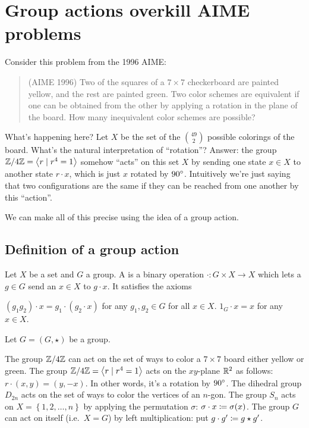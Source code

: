 \chapter{Group actions overkill AIME problems}
Consider this problem from the 1996 AIME:
\begin{quote}
	(AIME 1996) Two of the squares of a $7 \times 7$ checkerboard are painted yellow, and the rest are painted green. Two color schemes are equivalent if one can be obtained from the other by applying a rotation in the plane of the board. How many inequivalent color schemes are possible?
\end{quote}

What's happening here? Let $X$ be the set of the $\binom{49}{2}$ possible colorings of the board.
What's the natural interpretation of ``rotation''?
Answer: the group $\mathbb Z/4\mathbb Z = \left<r \mid r^4=1\right>$ somehow ``acts'' on this set $X$ by sending one state $x \in X$ to another state $r \cdot x$, which is just $x$ rotated by $90^\circ$.
Intuitively we're just saying that two configurations are the same if they can be reached from one another by this ``action''.

We can make all of this precise using the idea of a group action.

\section{Definition of a group action}

\begin{definition}
	Let $X$ be a set and $G$ a group.
	A  is a binary operation $\cdot \colon G \times X \to X$
	which lets a $g \in G$ send an $x \in X$ to $g \cdot x$.
	It satisfies the axioms
	\begin{itemize}
		\ii $(g_1g_2) \cdot x = g_1 \cdot (g_2 \cdot x)$ for any $g_1, g_2 \in G$
		for all $x \in X$.
		\ii $1_G \cdot x = x$ for any $x \in X$.
	\end{itemize}
\end{definition}

\begin{example}
	Let $G=(G,\star)$ be a group.
	\begin{enumerate}[(a)]
		\ii The group $\mathbb Z/4\mathbb Z$ can act on the set of ways to color a $7 \times 7$
		board either yellow or green.
		\ii The group $\mathbb Z/4\mathbb Z = \left<r \mid r^4=1\right>$ acts on the $xy$-plane $\mathbb R^2$ as follows: $r \cdot (x,y) = (y,-x)$.
		In other words, it's a rotation by $90^\circ$.
		\ii The dihedral group $D_{2n}$ acts on the set of ways to color the vertices of an $n$-gon.
		\ii The group $S_n$ acts on $X = \left\{ 1,2,\dots,n \right\}$
		by applying the permutation $\sigma$: $\sigma \cdot x \coloneqq \sigma(x)$.
		\ii The group $G$ can act on itself (i.e.\ $X=G$) by left multiplication: put $g \cdot g' \coloneqq g \star g'$.
	\end{enumerate}
\end{example}

